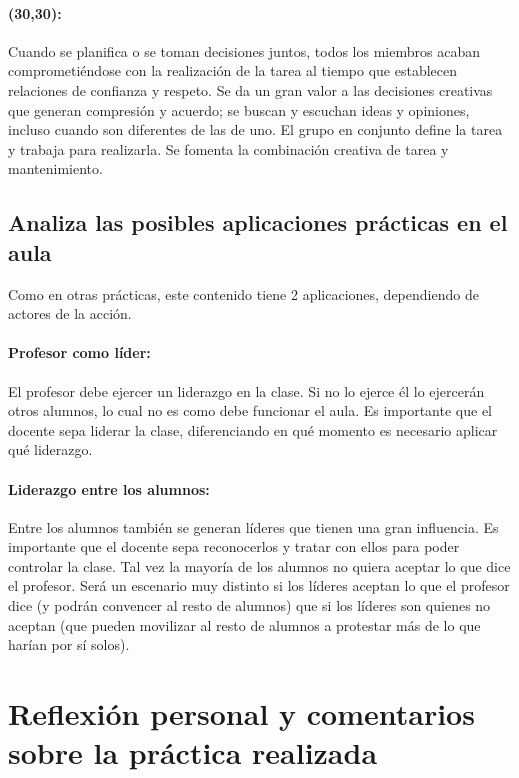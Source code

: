 \documentclass[palatino,nochap]{apuntesURJC}
\begin{document}
\paragraph{(30,30):} 
%
Cuando se planifica o se toman decisiones juntos, todos los miembros acaban comprometiéndose con la realización de la tarea al tiempo que establecen relaciones de confianza y respeto. 
%
Se da un gran valor a las decisiones creativas que generan compresión y acuerdo; se buscan y escuchan ideas y opiniones, incluso cuando son diferentes de las de uno.
%
El grupo en conjunto define la tarea y trabaja para realizarla.
%
Se fomenta la combinación creativa de tarea y mantenimiento.


\subsection{Analiza las posibles aplicaciones prácticas en el aula}


Como en otras prácticas, este contenido tiene 2 aplicaciones, dependiendo de actores de la acción.

\paragraph{Profesor como líder:} El profesor debe ejercer un liderazgo en la clase.
%
Si no lo ejerce él lo ejercerán otros alumnos, lo cual no es como debe funcionar el aula.
%
Es importante que el docente sepa liderar la clase, diferenciando en qué momento es necesario aplicar qué liderazgo.

\paragraph{Liderazgo entre los alumnos:} Entre los alumnos también se generan líderes que tienen una gran influencia.
%
Es importante que el docente sepa reconocerlos y tratar con ellos para poder controlar la clase.
%
Tal vez la mayoría de los alumnos no quiera aceptar lo que dice el profesor.
%
Será un escenario muy distinto si los líderes aceptan lo que el profesor dice (y podrán convencer al resto de alumnos) que si los líderes son quienes no aceptan (que pueden movilizar al resto de alumnos a protestar más de lo que harían por sí solos).



\section{Reflexión personal y comentarios sobre la práctica realizada}
\end{document}
